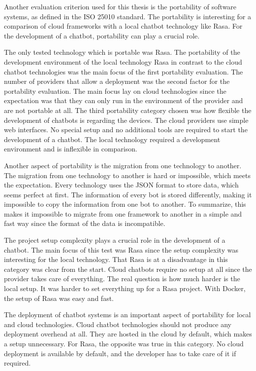 Another evaluation criterion used for this thesis is the portability of software systems, as defined in the ISO 25010\cite{iso25010} standard.
The portability is interesting for a comparison of cloud frameworks with a  local chatbot technology like Rasa.
For the development of a chatbot, portability can play a crucial role.

The only tested technology which is portable was Rasa. 
The portability of the development environment of the local technology Rasa in contrast to the cloud chatbot technologies was the main focus of the first portability evaluation.
The number of providers that allow a deployment was the second factor for the portability evaluation.
The main focus lay on cloud technologies since the expectation was
that they can only run in the environment of the provider and are 
not portable at all.
The third portability category chosen was how flexible the development
of chatbots is regarding the devices.
The cloud providers use simple web interfaces.
No special setup and no additional tools are required to start the development of a chatbot.
The local technology required a development environment and is inflexible in comparison.

Another aspect of portability is the migration from one technology to another.
The migration from one technology to another is hard or impossible, which meets the expectation.
Every technology uses the JSON format to store data, which seems perfect at first.
The information of every bot is stored differently, making it impossible to copy the information from one bot to another.
To summarize, this makes it impossible to migrate from one framework to another in a simple and fast way since the format of the data is incompatible. 

The project setup complexity plays a crucial role in the development of a chatbot.
The main focus of this test was Rasa since the setup complexity was interesting for the local technology.
That Rasa is at a disadvantage in this category was clear from the start.
Cloud chatbots require no setup at all since the provider takes care of everything.
The real question is how much harder is the local setup.
It was harder to set everything up for a Rasa project.
With Docker, the setup of Rasa was easy and fast.  

The deployment of chatbot systems is an important aspect of portability for local and cloud technologies.
Cloud chatbot technologies should not produce any deployment overhead at all.
They are hosted in the cloud by default, which makes a setup unnecessary.
For Rasa, the opposite was true in this category.
No cloud deployment is available by default, and the developer has to take care of it if required.

